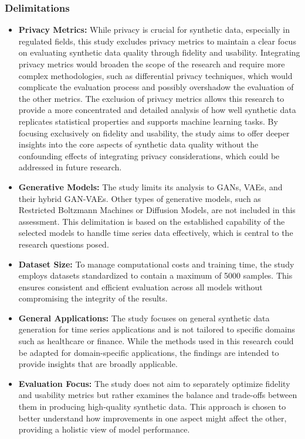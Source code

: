 \documentclass[11pt]{article}
\begin{document}
\subsubsection{Delimitations}
\begin{itemize}
    \item \textbf{Privacy Metrics:} While privacy is crucial for synthetic data, especially in regulated fields, this study excludes privacy metrics to maintain a clear focus on evaluating synthetic data quality through fidelity and usability. Integrating privacy metrics would broaden the scope of the research and require more complex methodologies, such as differential privacy techniques, which would complicate the evaluation process and possibly overshadow the evaluation of the other metrics. The exclusion of privacy metrics allows this research to provide a more concentrated and detailed analysis of how well synthetic data replicates statistical properties and supports machine learning tasks. By focusing exclusively on fidelity and usability, the study aims to offer deeper insights into the core aspects of synthetic data quality without the confounding effects of integrating privacy considerations, which could be addressed in future research.

    \item \textbf{Generative Models:} The study limits its analysis to GANs, VAEs, and their hybrid GAN-VAEs. Other types of generative models, such as Restricted Boltzmann Machines or Diffusion Models, are not included in this assessment. This delimitation is based on the established capability of the selected models to handle time series data effectively, which is central to the research questions posed.

    \item \textbf{Dataset Size:} To manage computational costs and training time, the study employs datasets standardized to contain a maximum of 5000 samples. This ensures consistent and efficient evaluation across all models without compromising the integrity of the results.
    
    \item \textbf{General Applications:} The study focuses on general synthetic data generation for time series applications and is not tailored to specific domains such as healthcare or finance. While the methods used in this research could be adapted for domain-specific applications, the findings are intended to provide insights that are broadly applicable.

    \item \textbf{Evaluation Focus:} The study does not aim to separately optimize fidelity and usability metrics but rather examines the balance and trade-offs between them in producing high-quality synthetic data. This approach is chosen to better understand how improvements in one aspect might affect the other, providing a holistic view of model performance. 

\end{itemize}
\end{document}

